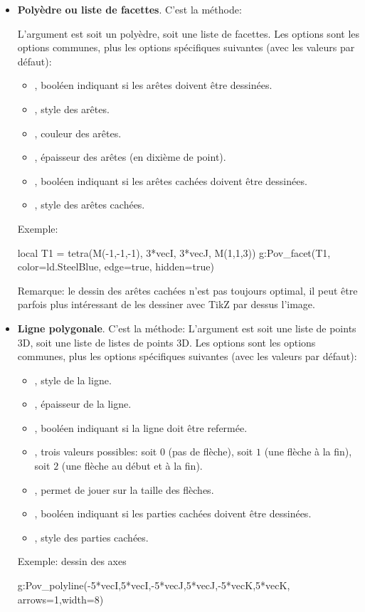 \begin{itemize}
    \item \textbf{Polyèdre ou liste de facettes}. C'est la méthode: 
    
    L'argument  est soit un polyèdre, soit une liste de facettes. Les options sont les options communes, plus les options spécifiques suivantes (avec les valeurs par défaut): 
    \begin{itemize}
        \item {}, booléen indiquant si les arêtes doivent être dessinées.
        \item {}, style des arêtes.
        \item {}, couleur des arêtes.
        \item {}, épaisseur des arêtes (en dixième de point).
        \item {}, booléen indiquant si les arêtes cachées doivent être dessinées.
        \item {}, style des arêtes cachées.
    \end{itemize}
    Exemple:
    \begin{Luacode}
    local T1 = tetra(M(-1,-1,-1), 3*vecI, 3*vecJ, M(1,1,3))
    g:Pov_facet(T1, {color=ld.SteelBlue, edge=true, hidden=true})
    \end{Luacode}
    Remarque: le dessin des arêtes cachées n'est pas toujours optimal, il peut être parfois plus intéressant de les dessiner avec TikZ par dessus l'image.
    
    
    \item \textbf{Ligne polygonale}. C'est la méthode:
    L'argument  est soit une liste de points 3D, soit une liste de listes de points 3D. Les options sont les options communes, plus les options spécifiques suivantes (avec les valeurs par défaut): 
        \begin{itemize}
        \item {}, style de la ligne.
        \item {}, épaisseur de la ligne.
        \item {}, booléen indiquant si la ligne doit être refermée.
        \item {}, trois valeurs possibles: soit $0$ (pas de flèche),  soit $1$ (une flèche à la fin), soit $2$ (une flèche au début et à la fin).
        \item {}, permet de jouer sur la taille des flèches.
        \item {}, booléen indiquant si les parties cachées doivent être dessinées.
        \item {}, style des parties cachées.
    \end{itemize}
    Exemple: dessin des axes
    \begin{Luacode}
    g:Pov_polyline({{-5*vecI,5*vecI},{-5*vecJ,5*vecJ},{-5*vecK,5*vecK}}, {arrows=1,width=8})
    \end{Luacode}
    

\end{itemize}
